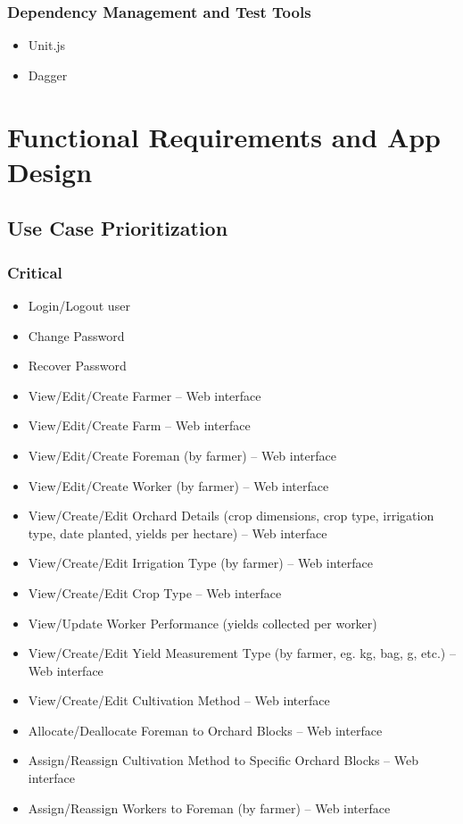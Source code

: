 \documentclass[11pt,fleqn]{book} %
\begin{document}
		\subsection{Dependency Management and Test Tools}
			\begin{itemize}
				\item Unit.js
				\item Dagger
			\end{itemize}



\chapter{Functional Requirements and App Design}

	\section{Use Case Prioritization}
		\subsection{Critical}
			\begin{itemize}
				\item Login/Logout user
				\item Change Password
				\item Recover Password
				\item View/Edit/Create Farmer – Web interface
				\item View/Edit/Create Farm – Web interface
				\item View/Edit/Create Foreman (by farmer) – Web interface
				\item View/Edit/Create Worker (by farmer) – Web interface
				\item View/Create/Edit Orchard Details (crop dimensions, crop type, irrigation type, date planted, yields per hectare) – Web interface
				\item View/Create/Edit Irrigation Type (by farmer) – Web interface
				\item View/Create/Edit Crop Type – Web interface
				\item View/Update Worker Performance (yields collected per worker)
				\item View/Create/Edit Yield Measurement Type (by farmer, eg. kg, bag, g, etc.) – Web interface
				\item View/Create/Edit Cultivation Method – Web interface
				\item Allocate/Deallocate Foreman to Orchard Blocks – Web interface
				\item Assign/Reassign Cultivation Method to Specific Orchard Blocks – Web interface
				\item Assign/Reassign Workers to Foreman (by farmer) – Web interface
				
			\end{itemize}
		
\end{document}
